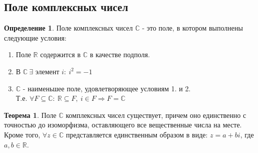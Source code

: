 \documentclass[a4paper, 12pt]{article}
\newcommand{\R}{\mathbb R}
\theoremstyle{definition}
\newtheorem*{definition}{Определение}
\newtheorem*{theorem}{Теорема}
\begin{document}
  \subsection{Поле комплексных чисел}
  \begin{definition}
    Поле комплексных чисел $\mathbb{C} $ - это поле, в котором выполнены следующие условия:
    \begin{enumerate}
      \item Поле $\R$ содержится в $\mathbb{C} $ в качестве подполя.
      \item В $\mathbb{C} \ \exists$ элемент $i:\  i^2 = -1$
      \item $\mathbb{C} $ - наименьшее поле, удовлетворяющее условиям 1. и 2.\\
      Т.е. $\forall F\subseteq \mathbb{C}: \ \R \subseteq F, \ i\in F \Longrightarrow  F = \mathbb{C}$
    \end{enumerate}
     
  \end{definition} 
  \begin{theorem}
    Поле $\mathbb{C}$ комплексных чисел существует, причем оно единственно с точностью до изоморфизма, оставляющего все вещественные числа на месте. Кроме того, $\forall z \in \mathbb{C}$ представляется единственным образом в виде: $z = a + bi$, где $a, b \in \R$.
  \end{theorem} 
\end{document}
